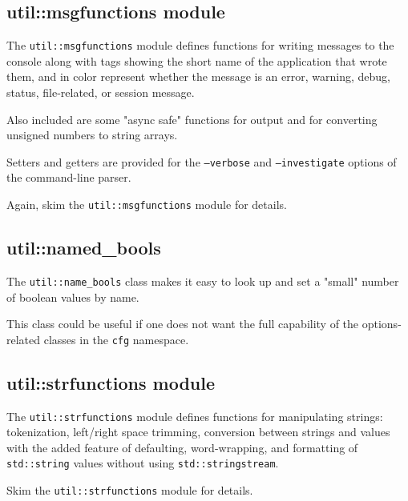 \subsection{util::msgfunctions module}
\label{subsec:util_namespace_msgfunctions}

   The \texttt{util::msgfunctions} module defines functions for writing
   messages to the console along with tags showing the short name of the
   application that wrote them, and in color represent whether the message
   is an error, warning, debug, status, file-related, or session message.

   Also included are some "async safe" functions for output and for
   converting unsigned numbers to string arrays.

   Setters and getters are provided for the \texttt{--verbose} and
   \texttt{--investigate} options of the command-line parser.

   Again, skim the \texttt{util::msgfunctions} module for details.

\subsection{util::named\_bools}
\label{subsec:util_namespace_named_bools}

   The \texttt{util::name\_bools} class
   makes it easy to look up and set a "small" number of
   boolean values by name.

   This class could be useful if one does not want the full capability
   of the options-related classes in the \texttt{cfg} namespace.

\subsection{util::strfunctions module}
\label{subsec:util_namespace_strfunctions}

   The \texttt{util::strfunctions} module defines functions for manipulating
   strings: tokenization, left/right space trimming, conversion between
   strings and values with the added feature of defaulting, word-wrapping,
   and formatting of \texttt{std::string} values without using
   \texttt{std::stringstream}.

   Skim the \texttt{util::strfunctions} module for details.

